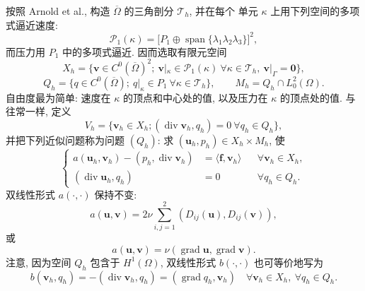 按照 Arnold et al., 构造 $\overline\Omega$ 的三角剖分 $\mathcal T_h$, 并在每个
单元 $\kappa$ 上用下列空间的多项式逼近速度:
\begin{equation}\label{eq:primitive-mini-local-space}
\mathcal P_1(\kappa)
=\bigl[P_1\oplus\operatorname{span}\{\lambda_1\lambda_2\lambda_3\}\bigr]^2,
\end{equation}
而压力用 $P_1$ 中的多项式逼近. 因而选取有限元空间
\begin{equation}\label{eq:primitive-mini-velocity-space}
X_h=\{\mathbf v\in C^0(\overline\Omega)^2;
\ \mathbf v|_\kappa\in\mathcal P_1(\kappa)\ \forall\kappa\in\mathcal T_h,
\ \mathbf v|_\Gamma=\mathbf0\},
\end{equation}
\begin{equation}\label{eq:primitive-continuous-linear-pressure-spaces}
Q_h=\{q\in C^0(\overline\Omega);\ q|_\kappa\in P_1
\ \forall\kappa\in\mathcal T_h\},
\qquad M_h=Q_h\cap L_0^2(\Omega).
\end{equation}
自由度最为简单: 速度在 $\kappa$ 的顶点和中心处的值, 以及压力在
$\kappa$ 的顶点处的值. 与往常一样, 定义
\[
V_h=\{\mathbf v_h\in X_h;
(\operatorname{div}\mathbf v_h,q_h)=0\ \forall q_h\in Q_h\},
\]
并把下列近似问题称为问题 $(Q_h)$: 求
$(\mathbf u_h,p_h)\in X_h\times M_h$, 使
\begin{equation}\label{eq:primitive-continuous-pressure-discrete-problem}
\left\{
\begin{aligned}
a(\mathbf u_h,\mathbf v_h)-(p_h,\operatorname{div}\mathbf v_h)
&=\langle\mathbf f,\mathbf v_h\rangle
&&\forall\mathbf v_h\in X_h,\\
(\operatorname{div}\mathbf u_h,q_h)&=0
&&\forall q_h\in Q_h.
\end{aligned}
\right.
\end{equation}
双线性形式 $a(\cdot,\cdot)$ 保持不变:
\[
a(\mathbf u,\mathbf v)=2\nu\sum_{i,j=1}^2
(D_{ij}(\mathbf u),D_{ij}(\mathbf v)),
\]
或
\[
a(\mathbf u,\mathbf v)=\nu(\operatorname{grad}\mathbf u,
\operatorname{grad}\mathbf v).
\]
注意, 因为空间 $Q_h$ 包含于 $H^1(\Omega)$, 双线性形式
$b(\cdot,\cdot)$ 也可等价地写为
\[
b(\mathbf v_h,q_h)=-(\operatorname{div}\mathbf v_h,q_h)
=(\operatorname{grad}q_h,\mathbf v_h)
\quad\forall\mathbf v_h\in X_h,\ \forall q_h\in Q_h.
\]

